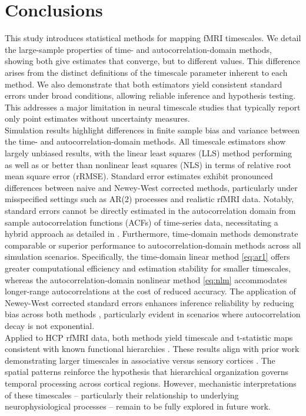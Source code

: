 \documentclass[docs/main.tex]{subfiles}
\begin{document}
\section{Conclusions}
This study introduces statistical methods for mapping fMRI timescales. We detail the large-sample properties of time- and autocorrelation-domain methods, showing both give estimates that converge, but to different values. This difference arises from the distinct definitions of the timescale parameter inherent to each method. We also demonstrate that both estimators yield consistent standard errors under broad conditions, allowing reliable inference and hypothesis testing. This addresses a major limitation in neural timescale studies that typically report only point estimates without uncertainty measures.\\

Simulation results highlight differences in finite sample bias and variance between the time- and autocorrelation-domain methods. All timescale estimators show largely unbiased results, with the linear least squares (LLS) method performing as well as or better than nonlinear least squares (NLS) in terms of relative root mean square error (rRMSE). Standard error estimates exhibit pronounced differences between naive and Newey-West corrected methods, particularly under misspecified settings such as AR(2) processes and realistic rfMRI data. Notably, standard errors cannot be directly estimated in the autocorrelation domain from sample autocorrelation functions (ACFs) of time-series data, necessitating a hybrid approach as detailed in . Furthermore, time-domain methods demonstrate comparable or superior performance to autocorrelation-domain methods across all simulation scenarios. Specifically, the time-domain linear method \eqref{eq:ar1} offers greater computational efficiency and estimation stability for smaller timescales, whereas the autocorrelation-domain nonlinear method \eqref{eq:nlm} accommodates longer-range autocorrelations at the cost of reduced accuracy. The application of Newey-West corrected standard errors enhances inference reliability by reducing bias across both methods \citep{newey_simple_1987}, particularly evident in scenarios where autocorrelation decay is not exponential.\\

Applied to HCP rfMRI data, both methods yield timescale and t-statistic maps consistent with known functional hierarchies \citep{van_essen_wu-minn_2013}. These results align with prior work demonstrating larger timescales in associative versus sensory cortices \citep{raut_hierarchical_2020, shafiei_topographic_2020, lurie_cortical_2024, mitra_lag_2014, kaneoke_variance_2012, wengler_distinct_2020, shinn_functional_2023, manea_intrinsic_2022, ito_cortical_2020, muller_core_2020}. The spatial patterns reinforce the hypothesis that hierarchical organization governs temporal processing across cortical regions. However, mechanistic interpretations of these timescales -- particularly their relationship to underlying neurophysiological processes -- remain to be fully explored in future work.\\
\end{document}
